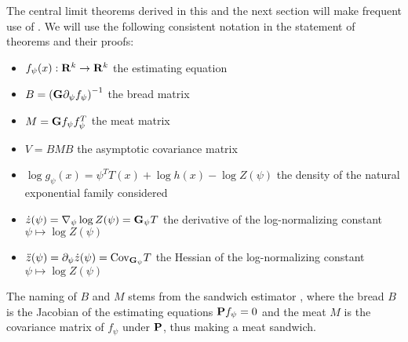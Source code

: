 \begin{notation}
    \label{not:notation-clt}
    The central limit theorems derived in this and the next section will make frequent use of . We will use the following consistent notation in the statement of theorems and their proofs:
    \begin{itemize}
        \item $f_\psi(x): \R^{k} \to \R^{k}$ the estimating equation              
        \item $B = \left(\G\partial_{\psi} f_{\psi}\right)^{-1}$ the bread matrix
        \item $M = \G f_{\psi}f_{\psi}^{T}$ the meat matrix
        \item $V = BMB$ the asymptotic covariance matrix
        \item $\log g_{\psi}(x) = \psi^{T}T(x) + \log h(x) - \log Z(\psi)$ the density of the natural exponential family considered
        \item $\dot z (\psi) = \nabla_{\psi}\log Z(\psi) = \G_{\psi} T$ the derivative of the log-normalizing constant $\psi \mapsto \log Z(\psi)$
        \item $\ddot z(\psi) = \partial_{\psi} \dot z(\psi) =\cov_{\G_{\psi}}T$ the Hessian of the log-normalizing constant $\psi \mapsto \log Z(\psi)$
    \end{itemize}
    The naming of $B$ and $M$ stems from the sandwich estimator \cite{White1982Maximum}, where the bread $B$ is the Jacobian of the estimating equations $\P f_{\psi} = 0$ and the meat $M$ is the covariance matrix of $f_{\psi}$ under $\P$, thus making a \glqq{}meat sandwich\grqq{}.
\end{notation}

\begin{theorem}
    \label{thm:ce-consistent}
\end{theorem}


